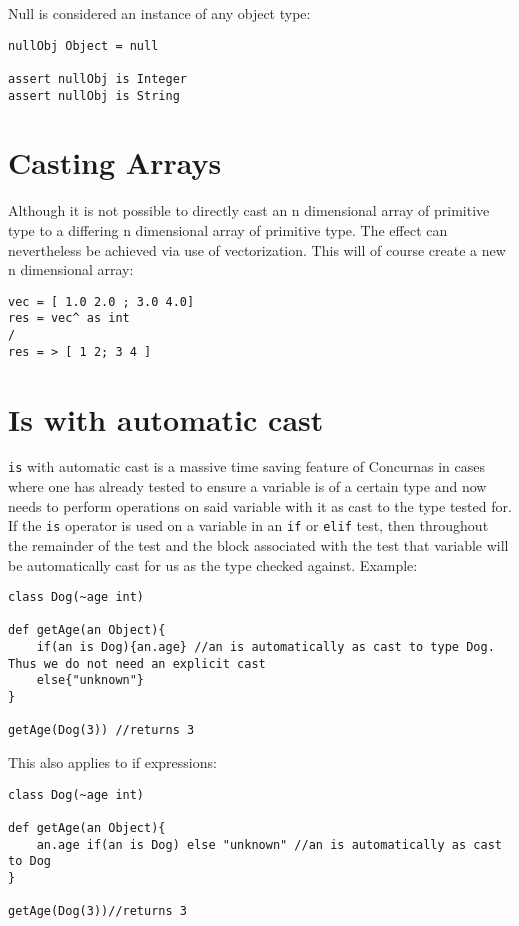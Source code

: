 \documentclass[conc-doc]{subfiles}
\begin{document}
Null is considered an instance of any object type:
\begin{lstlisting}
nullObj Object = null

assert nullObj is Integer
assert nullObj is String
\end{lstlisting}

\section{Casting Arrays}

Although it is not possible to directly cast an n dimensional array of primitive type to a differing n dimensional array of primitive type. The effect can nevertheless be achieved via use of vectorization. This will of course create a new n dimensional array:
\begin{lstlisting}
vec = [ 1.0 2.0 ; 3.0 4.0]
res = vec^ as int
/
res = > [ 1 2; 3 4 ]
\end{lstlisting}

\section{Is with automatic cast}
\lstinline{is} with automatic cast is a massive time saving feature of Concurnas in cases where one has already tested to ensure a variable is of a certain type and now needs to perform operations on said variable with it as cast to the type tested for. If the \lstinline{is} operator is used on a variable in an \lstinline{if} or \lstinline{elif} test, then throughout the remainder of the test and the block associated with the test that variable will be automatically cast for us as the type checked against. Example:
\begin{lstlisting}
class Dog(~age int)

def getAge(an Object){
	if(an is Dog){an.age} //an is automatically as cast to type Dog. Thus we do not need an explicit cast
	else{"unknown"}
}

getAge(Dog(3)) //returns 3
\end{lstlisting}

This also applies to if expressions:
\begin{lstlisting}
class Dog(~age int)

def getAge(an Object){
	an.age if(an is Dog) else "unknown" //an is automatically as cast to Dog 
}

getAge(Dog(3))//returns 3
\end{lstlisting}
\end{document}
